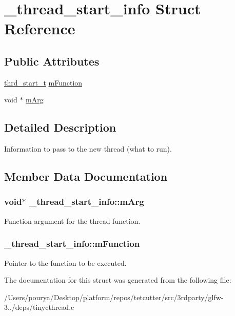 \hypertarget{struct__thread__start__info}{}\section{\+\_\+thread\+\_\+start\+\_\+info Struct Reference}
\label{struct__thread__start__info}
\subsection*{Public Attributes}
\begin{DoxyCompactItemize}
\item 
\hyperlink{tinycthread_8h_ab26bdfa456502f8c483f45bb39ca7336}{thrd\+\_\+start\+\_\+t} \hyperlink{struct__thread__start__info_af8538b214eba5919c21dde7cf7102c83}{m\+Function}
\item 
void $\ast$ \hyperlink{struct__thread__start__info_a0d38b31c203749b40fd7926c8f4579fa}{m\+Arg}
\end{DoxyCompactItemize}


\subsection{Detailed Description}
Information to pass to the new thread (what to run). 

\subsection{Member Data Documentation}
\hypertarget{struct__thread__start__info_a0d38b31c203749b40fd7926c8f4579fa}{}
\subsubsection[{m\+Arg}]{\setlength{\rightskip}{0pt plus 5cm}void$\ast$ \+\_\+thread\+\_\+start\+\_\+info\+::m\+Arg}\label{struct__thread__start__info_a0d38b31c203749b40fd7926c8f4579fa}
Function argument for the thread function. \hypertarget{struct__thread__start__info_af8538b214eba5919c21dde7cf7102c83}{}
\subsubsection[{m\+Function}]{ \+\_\+thread\+\_\+start\+\_\+info\+::m\+Function}\label{struct__thread__start__info_af8538b214eba5919c21dde7cf7102c83}
Pointer to the function to be executed. 

The documentation for this struct was generated from the following file\+:\begin{DoxyCompactItemize}
\item 
/\+Users/pourya/\+Desktop/platform/repos/tetcutter/src/3rdparty/glfw-\/3../deps/tinycthread.\+c\end{DoxyCompactItemize}
